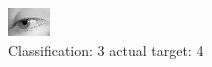 \begin{figure}[h!]
\begin{center}
\includegraphics[width=0.60\columnwidth]{figures/ID2951_class_3_target_4.png}
\end{center}
\caption{ Classification: 3 actual target: 4}
\label{fig:ID2951_class_3_target_4}
\end{figure}
